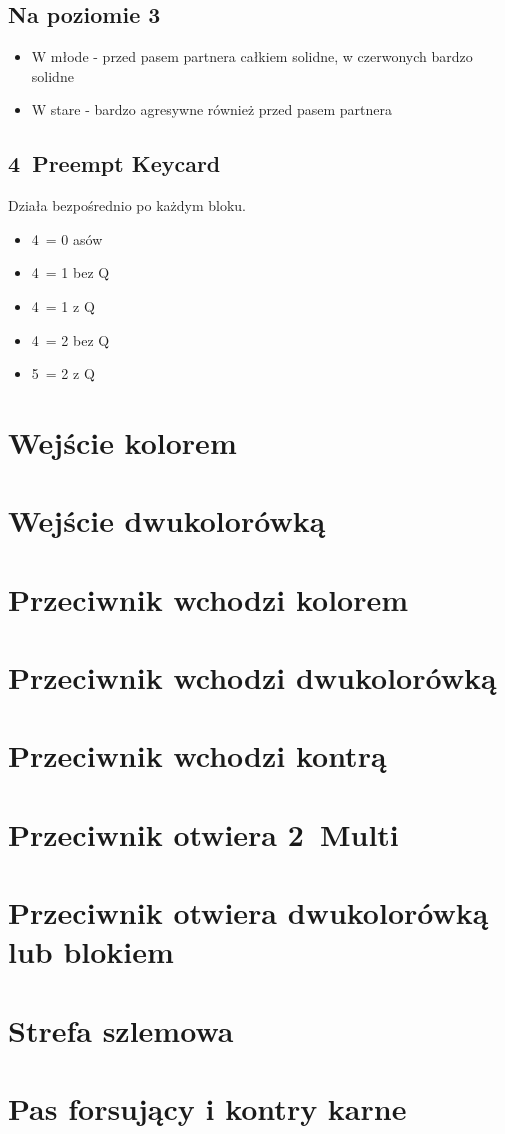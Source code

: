 \documentclass[12pt, a4paper]{article}
\begin{document}
\subsection*{Na poziomie 3}
\begin{itemize}
    \item W młode - przed pasem partnera całkiem solidne, w czerwonych bardzo solidne
    \item W stare - bardzo agresywne również przed pasem partnera
\end{itemize}

\subsection*{4\clubs\ Preempt Keycard}
Działa bezpośrednio po każdym bloku.
\begin{itemize}
    \item 4\diams\ = 0 asów
    \item 4\hearts\ = 1 bez Q
    \item 4\spades\ = 1 z Q
    \item 4\nt\ = 2 bez Q
    \item 5\clubs\ = 2 z Q
\end{itemize}


\pagebreak
\section{Wejście kolorem}
\section{Wejście dwukolorówką}
\section{Przeciwnik wchodzi kolorem}
\section{Przeciwnik wchodzi dwukolorówką}
\section{Przeciwnik wchodzi kontrą}
\section{Przeciwnik otwiera 2\diams\ Multi}
\section{Przeciwnik otwiera dwukolorówką lub blokiem}
\section{Strefa szlemowa}
\section{Pas forsujący i kontry karne}
\end{document}
